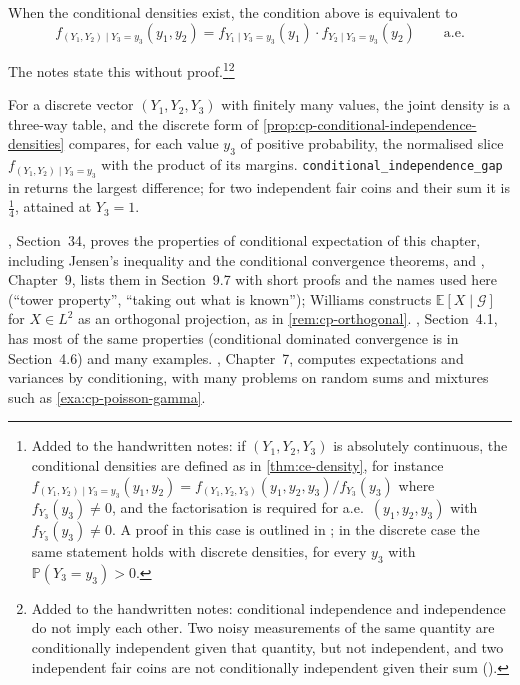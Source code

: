 \begin{proposition}\label{prop:cp-conditional-independence-densities}
When the conditional densities exist, the condition above is equivalent to
\[
  f_{(Y_1,Y_2)\mid Y_3=y_3}(y_1,y_2)=f_{Y_1\mid Y_3=y_3}(y_1)\cdot f_{Y_2\mid Y_3=y_3}(y_2)\qquad\text{a.e.}
\]
\end{proposition}

The notes state this without proof.\footnote{Added to the handwritten notes: if $(Y_1,Y_2,Y_3)$ is
absolutely continuous, the conditional densities are defined as in \cref{thm:ce-density}, for
instance $f_{(Y_1,Y_2)\mid Y_3=y_3}(y_1,y_2)=f_{(Y_1,Y_2,Y_3)}(y_1,y_2,y_3)/f_{Y_3}(y_3)$ where
$f_{Y_3}(y_3)\ne0$, and the factorisation is required for a.e.\ $(y_1,y_2,y_3)$ with
$f_{Y_3}(y_3)\ne0$. A proof in this case is outlined in ; in
the discrete case the same statement holds with discrete densities, for every $y_3$ with
$\mathbb P(Y_3=y_3)>0$.}\footnote{Added to the handwritten notes: conditional independence and
independence do not imply each other. Two noisy measurements of the same quantity are
conditionally independent given that quantity, but not independent, and two independent fair coins
are not conditionally independent given their sum ().}

\begin{remark}[computational]\label{rem:cp-code-conditional-independence}
For a discrete vector $(Y_1,Y_2,Y_3)$ with finitely many values, the joint density is a
three-way table, and the discrete form of \cref{prop:cp-conditional-independence-densities}
compares, for each value $y_3$ of positive probability, the normalised slice
$f_{(Y_1,Y_2)\mid Y_3=y_3}$ with the product of its margins.
\texttt{conditional\_independence\_gap} in  returns the
largest difference; for two independent fair coins and their sum it is $\frac14$, attained at
$Y_3=1$.
\end{remark}

\furtherreading
\textcite{billingsley}, Section~34, proves the properties of conditional expectation of this
chapter, including Jensen's inequality and the conditional convergence theorems, and
\textcite{williams}, Chapter~9, lists them in Section~9.7 with short proofs and the names used
here (``tower property'', ``taking out what is known''); Williams constructs
$\mathbb E[X\mid\mathcal G]$ for $X\in L^2$ as an orthogonal projection, as in
\cref{rem:cp-orthogonal}. \textcite{durrett}, Section~4.1, has most of the same properties
(conditional dominated convergence is in Section~4.6) and many examples. \textcite{ross-5}, Chapter~7, computes expectations and variances by conditioning,
with many problems on random sums and mixtures such as \cref{exa:cp-poisson-gamma}.
